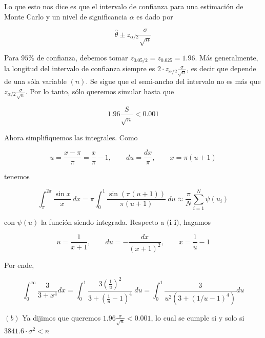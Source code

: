\documentclass[a4paper, 12pt]{article}
\begin{document}
Lo que esto nos dice es que el intervalo de confianza para una estimación de
Monte Carlo y un nivel de significancia $\alpha$ es dado por

\begin{equation*}
    \hat{\theta} \pm z_{\alpha / 2} \frac{\sigma}{\sqrt{n} }
\end{equation*}

Para $95\%$ de confianza, debemos tomar $z_{0.05 / 2} = z_{0.025} = 1.96$. Más generalmente, la longitud del intervalo de confianza siempre es $2 \cdot
z_{\alpha /  2} \frac{\sigma}{\sqrt{n} }$, es decir que depende de una sóla
variable $(n)$. Se sigue que el semi-ancho del intervalo no es más que
$z_{\alpha / 2} \frac{\sigma}{\sqrt{n} }$. Por lo tanto, sólo queremos simular
hasta que 

\begin{equation*}
    1.96 \frac{S}{\sqrt{n} } < 0.001
\end{equation*}

Ahora simplifiquemos las integrales. Como

\begin{equation*}
    u = \frac{ x - \pi }{\pi} = \frac{x}{\pi} - 1, \qquad du = \frac{ dx }{\pi},
    \qquad x = \pi(u + 1)
\end{equation*}

tenemos 

\begin{equation*}
    \int_{\pi}^{2\pi} \frac{\sin x}{x} ~ dx = \pi\int_0^1 \frac{\sin
    (\pi(u+1))}{\pi(u + 1)} ~ du \approx \frac{\pi}{N} \sum_{i=1}^N \psi(u_i)
\end{equation*}

con $\psi(u)$ la función siendo integrada. Respecto a $\textbf{(i i)}$, hagamos

\begin{equation*}
    u = \frac{1}{x+1}, \qquad du = - \frac{dx}{(x+1)^2}, \qquad x = \frac{1}{u}
    - 1
\end{equation*}

Por ende,

\begin{equation*}
    \int_0^\infty \frac{3}{3+x^4} dx = \int_0^1 \frac{3\left( \frac{1}{u}\right) ^2}{3 +
    (\frac{1}{u} - 1)^4} ~ du = \int_0^1 \frac{3}{u^2(3 + \left( 1 / u - 1
\right)^4 )} du
\end{equation*}




$(b)$ Ya dijimos que queremos $1.96 \frac{\sigma}{\sqrt{n} } < 0.001$, lo cual se
cumple si y solo si $3841.6 \cdot \sigma^2 < n$
\end{document}
